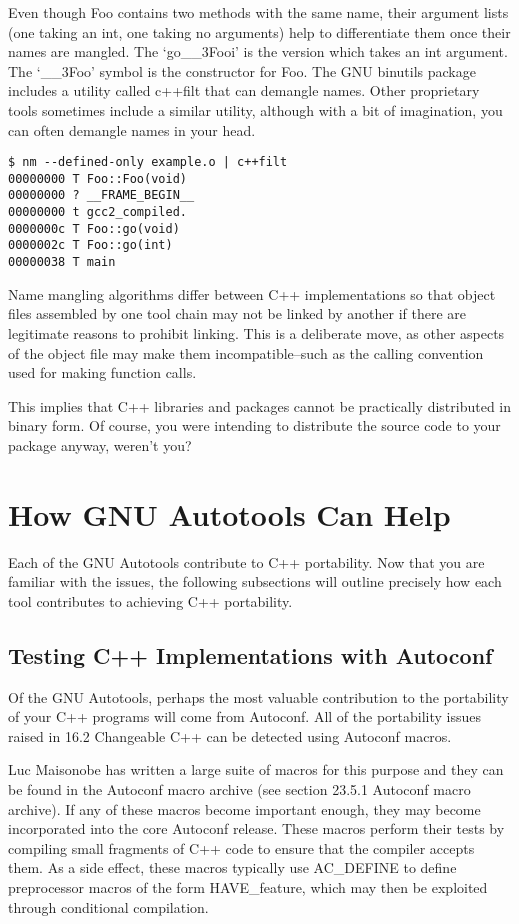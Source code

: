 Even though Foo contains two methods with the same name, their argument lists
(one taking an int, one taking no arguments) help to differentiate them 
once their names are mangled. The `go\_{}\_{}3Fooi' is the version which 
takes an int argument. The `\_{}\_{}3Foo' symbol is the constructor for Foo.
The GNU binutils package includes a utility called c++filt that can demangle 
names. Other proprietary tools sometimes include a similar utility, although 
with a bit of imagination, you can often demangle names in your head.

\begin{Verbatim}[frame=single]
$ nm --defined-only example.o | c++filt
00000000 T Foo::Foo(void)
00000000 ? __FRAME_BEGIN__
00000000 t gcc2_compiled.
0000000c T Foo::go(void)
0000002c T Foo::go(int)
00000038 T main
\end{Verbatim}

Name mangling algorithms differ between C++ implementations so that object files assembled by one tool chain may not be linked by another if there are legitimate reasons to prohibit linking. This is a deliberate move, as other aspects of the object file may make them incompatible--such as the calling convention used for making function calls.

This implies that C++ libraries and packages cannot be practically distributed in binary form. Of course, you were intending to distribute the source code to your package anyway, weren't you? 

\section{How GNU Autotools Can Help}

Each of the GNU Autotools contribute to C++ portability. Now that you are familiar with the issues, the following subsections will outline precisely how each tool contributes to achieving C++ portability. 

\subsection{Testing C++ Implementations with Autoconf}

Of the GNU Autotools, perhaps the most valuable contribution to the portability of your C++ programs will come from Autoconf. All of the portability issues raised in 16.2 Changeable C++ can be detected using Autoconf macros.

Luc Maisonobe has written a large suite of macros for this purpose and they can be found in the Autoconf macro archive (see section 23.5.1 Autoconf macro archive). If any of these macros become important enough, they may become incorporated into the core Autoconf release. These macros perform their tests by compiling small fragments of C++ code to ensure that the compiler accepts them. As a side effect, these macros typically use AC\_{}DEFINE to define preprocessor macros of the form HAVE\_{}feature, which may then be exploited through conditional compilation. 

